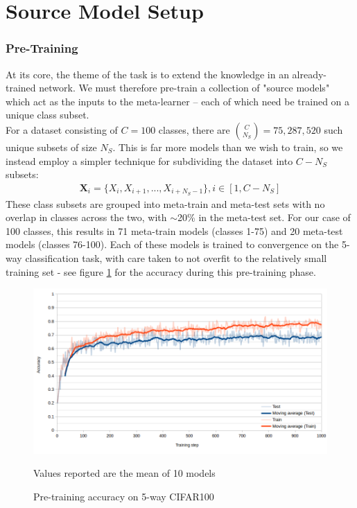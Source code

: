 \documentclass{report}
\begin{document}
\section{Source Model Setup} \label{commonalities}

\subsubsection{Pre-Training} \label{pre-training}
At its core, the theme of the task is to extend the knowledge in an already-trained network. We must therefore pre-train a collection of "source models" which act as the inputs to the meta-learner -- each of which need be trained on a unique class subset. \\
For a dataset consisting of $C=100$ classes, there are ${C\choose N_S} = 75,287,520$ such unique subsets of size $N_S$. This is far more models than we wish to train, so we instead employ a simpler technique for subdividing the dataset into $C-N_S$ subsets: 
\begin{align}
	\bm{X}_i = \lbrace X_i, X_{i+1}, ..., X_{i+N_S-1} \rbrace, i \in[1, C-N_S] 
\end{align}
These class subsets are grouped into meta-train and meta-test sets with no overlap in classes across the two, with $\sim$20\% in the meta-test set. For our case of 100 classes, this results in 71 meta-train models (classes 1-75) and 20 meta-test models (classes 76-100). Each of these models is trained to convergence on the 5-way classification task, with care taken to not overfit to the relatively small training set - see figure \ref{fig:pre-training-acc:1} for the accuracy during this pre-training phase. \\

\begin{figure}[h!]
	\centering
	\includegraphics[width=16cm]{pre-training-acc}
	\caption{Pre-training accuracy on 5-way CIFAR100}
	\label{fig:pre-training-acc:1}
	Values reported are the mean of 10 models
\end{figure}
\end{document}
